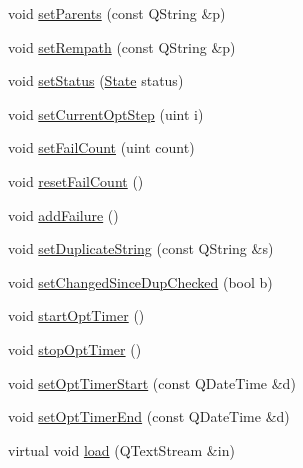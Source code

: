\begin{DoxyCompactItemize}
\item 
void \hyperlink{classGlobalSearch_1_1Structure_a4d833bf522b24a31bfd983ae16e370fe}{set\-Parents} (const Q\-String \&p)
\item 
void \hyperlink{classGlobalSearch_1_1Structure_adc3f7486abf0ad3421d60f6a05f3106e}{set\-Rempath} (const Q\-String \&p)
\item 
void \hyperlink{classGlobalSearch_1_1Structure_aee38b5fe04ee88a4584b181fa8d0fbf9}{set\-Status} (\hyperlink{classGlobalSearch_1_1Structure_a3f1e44cb4f603fe1b3fbc8e813535917}{State} status)
\item 
void \hyperlink{classGlobalSearch_1_1Structure_a3aa37aac76ad5255e51a9113b3d64d40}{set\-Current\-Opt\-Step} (uint i)
\item 
void \hyperlink{classGlobalSearch_1_1Structure_a130a124d8cd7d440d4c902726492e41b}{set\-Fail\-Count} (uint count)
\item 
void \hyperlink{classGlobalSearch_1_1Structure_a27532f25313083bea490b3b6fa84c743}{reset\-Fail\-Count} ()
\item 
void \hyperlink{classGlobalSearch_1_1Structure_ab1ea99315ad11fc88f0941069f169f1a}{add\-Failure} ()
\item 
void \hyperlink{classGlobalSearch_1_1Structure_a59fe04ad733d7a770e3775339d71b8c3}{set\-Duplicate\-String} (const Q\-String \&s)
\item 
void \hyperlink{classGlobalSearch_1_1Structure_a266a812642a92c135ae5c65157d528d6}{set\-Changed\-Since\-Dup\-Checked} (bool b)
\item 
void \hyperlink{classGlobalSearch_1_1Structure_ae623efedfaa8980e5121199eec928298}{start\-Opt\-Timer} ()
\item 
void \hyperlink{classGlobalSearch_1_1Structure_a5f19c86d2e41ec95efd370e87049384f}{stop\-Opt\-Timer} ()
\item 
void \hyperlink{classGlobalSearch_1_1Structure_afc5507175ebfb4da413a5c40a2a8dfb3}{set\-Opt\-Timer\-Start} (const Q\-Date\-Time \&d)
\item 
void \hyperlink{classGlobalSearch_1_1Structure_a9ca3435fd1e634ddd665a5af63abc431}{set\-Opt\-Timer\-End} (const Q\-Date\-Time \&d)
\item 
virtual void \hyperlink{classGlobalSearch_1_1Structure_aa9ede9f516912b34000000caa849689c}{load} (Q\-Text\-Stream \&in)
\end{DoxyCompactItemize}
